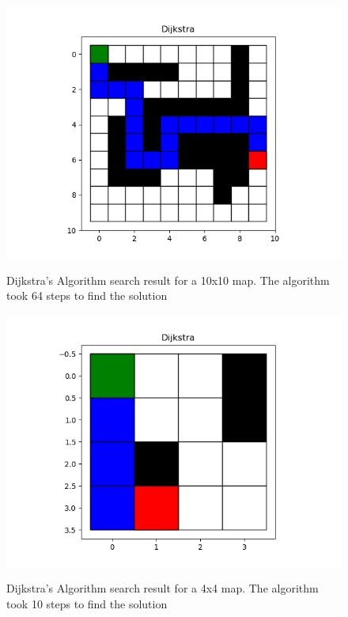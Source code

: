 \documentclass[journal]{IEEEtran}
\begin{document}
    \begin{figure}[ht]
        \includegraphics[width=\linewidth]{figures/Dijkstra_LargeMap_Path.png}
        \label{fig:Dijkstra_Weights_Example}
        \caption{Dijkstra's Algorithm search result for a 10x10 map. The algorithm took 64 steps to find the solution}
    \end{figure} 

    \begin{figure}[ht]
        \includegraphics[width=\linewidth]{figures/Dijkstra_SmallMap_Path.png}
        \label{fig:Dijkstra_Weights_Example}
        \caption{Dijkstra's Algorithm search result for a 4x4 map. The algorithm took 10 steps to find the solution}
    \end{figure} 
\end{document}

